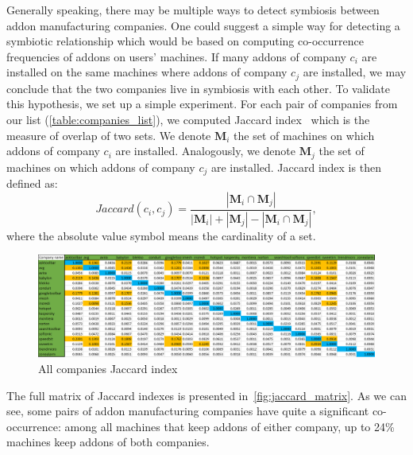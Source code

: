 \documentclass[ijoc,nonblindrev]{informs3} %
\numberwithin{equation}{subsection}
\begin{document}
Generally speaking, there may be multiple ways to detect symbiosis between addon manufacturing companies. One could suggest a simple way for detecting a symbiotic relationship which would be based on computing co-occurrence frequencies of addons on users' machines. If many addons of company $c_i$ are installed on the same machines where addons of company $c_j$ are installed, we may conclude that the two companies live in symbiosis with each other. To validate this hypothesis, we set up a simple experiment. For each pair of companies from our list (\autoref{table:companies_list}), we computed Jaccard index~\citep{jaccard1912distribution} which is the measure of overlap of two sets. We denote $\mathbf{M}_i$ the set of machines on which addons of company $c_i$ are installed. Analogously, we denote $\mathbf{M}_j$ the set of machines on which addons of company $c_j$ are installed. Jaccard index is then defined as:
$$
Jaccard(c_i, c_j) = \frac{|\mathbf{M}_i \cap \mathbf{M}_j|}{|\mathbf{M}_i| + |\mathbf{M}_j| - |\mathbf{M}_i \cap \mathbf{M}_j|},
$$
where the absolute value symbol means the cardinality of a set.

\begin{figure}[!htbp]
\centering
\includegraphics[width=\linewidth]{figures/JaccardMatrix.png}
\caption{All companies Jaccard index}
\label{fig:jaccard_matrix}
\end{figure}

The full matrix of Jaccard indexes is presented in~\autoref{fig:jaccard_matrix}. As we can see, some pairs of addon manufacturing companies have quite a significant co-occurrence: among all machines that keep addons of either company, up to 24\% machines keep addons of both companies. 
\end{document}
